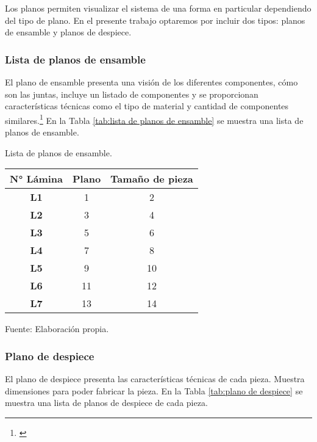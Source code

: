 Los planos permiten visualizar el sistema de una forma en particular dependiendo del tipo de plano. En el presente trabajo optaremos por incluir dos tipos: planos de ensamble y planos de despiece.

\subsubsection{Lista de planos de ensamble}

El plano de ensamble presenta una visión de los diferentes componentes, cómo son las juntas, incluye un listado de componentes y se proporcionan características técnicas como el  tipo de material y cantidad de componentes similares.\footnote{\cite{Goetsch2010}} En la Tabla \ref{tab:lista de planos de ensamble} se muestra una lista de planos de ensamble.


\begin{mytable}[H]
	\centering
	\caption{Lista de planos de ensamble.}
	\label{tab:lista de planos de ensamble}
	\begin{tabular}{|c|c|c|}
		\hline
		\textbf{N° Lámina} & \textbf{Plano} & \textbf{Tamaño de pieza} \\ \hline
		\textbf{L1}        & 1              & 2             \\ \hline
		\textbf{L2}        & 3              & 4             \\ \hline
		\textbf{L3}        & 5              & 6             \\ \hline
		\textbf{L4}        & 7              & 8             \\ \hline
		\textbf{L5}        & 9              & 10            \\ \hline
		\textbf{L6}        & 11             & 12            \\ \hline
		\textbf{L7}        & 13             & 14            \\ \hline
	\end{tabular}
	\begin{flushleft}	
	Fuente: Elaboración propia.
\end{flushleft}
\end{mytable}


\subsubsection{Plano de despiece}

El plano de despiece presenta las características técnicas de cada pieza. Muestra dimensiones para poder fabricar la pieza. En la Tabla \ref{tab:plano de despiece} se muestra una lista de planos de despiece de cada pieza.

